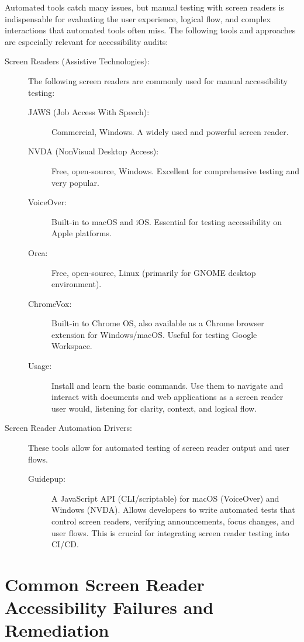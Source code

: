 Automated tools catch many issues, but manual testing with screen readers is indispensable for evaluating the user experience, logical flow, and complex interactions that automated tools often miss. The following tools and approaches are especially relevant for accessibility audits:

\begin{description}
    \item[Screen Readers (Assistive Technologies):] The following screen readers are commonly used for manual accessibility testing:
    \begin{description}
        \item[JAWS (Job Access With Speech):] \cite{JAWS} Commercial, Windows. A widely used and powerful screen reader.
        \item[NVDA (NonVisual Desktop Access):] \cite{NVDA} Free, open-source, Windows. Excellent for comprehensive testing and very popular.
        \item[VoiceOver:] \cite{VoiceOver} Built-in to macOS and iOS. Essential for testing accessibility on Apple platforms.
        \item[Orca:] \cite{Orca} Free, open-source, Linux (primarily for GNOME desktop environment).
        \item[ChromeVox:] \cite{ChromeVox} Built-in to Chrome OS, also available as a Chrome browser extension for Windows/macOS. Useful for testing Google Workspace.
        \item[Usage:] Install and learn the basic commands. Use them to navigate and interact with documents and web applications as a screen reader user would, listening for clarity, context, and logical flow.
    \end{description}
    \item[Screen Reader Automation Drivers:] These tools allow for automated testing of screen reader output and user flows.
    \begin{description}
        \item[Guidepup:] \cite{Guidepup} A JavaScript API (CLI/scriptable) for macOS (VoiceOver) and Windows (NVDA). Allows developers to write automated tests that control screen readers, verifying announcements, focus changes, and user flows. This is crucial for integrating screen reader testing into CI/CD.
    \end{description}
\end{description}

\section{Common Screen Reader Accessibility Failures and Remediation}
\label{sec:office-remediation}

